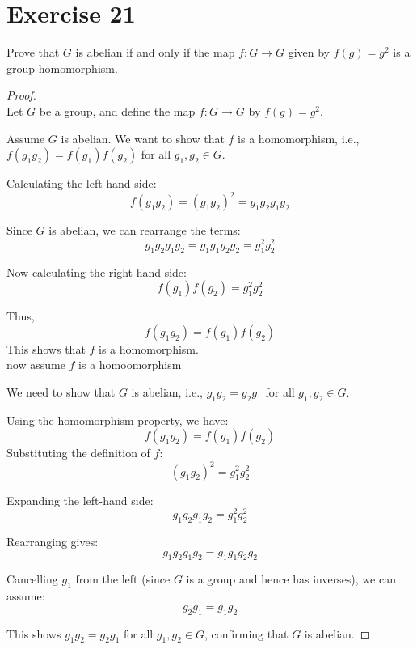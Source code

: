 \documentclass{article}
\begin{document}
\section*{Exercise 21}
Prove that $G$ is abelian if and only if the map $f: G \to G$ given by $f(g) = g^2$ is a group homomorphism.
\begin{proof}
        \leavevmode \\  
        Let \( G \) be a group, and define the map \( f: G \to G \) by \( f(g) = g^2 \).

      
        Assume $G$ is abelian. 
        We want to show that \( f \) is a homomorphism, i.e., \( f(g_1 g_2) = f(g_1) f(g_2) \) for all \( g_1, g_2 \in G \).
        
        Calculating the left-hand side:
        \[
        f(g_1 g_2) = (g_1 g_2)^2 = g_1 g_2 g_1 g_2
        \]
        
        Since \( G \) is abelian, we can rearrange the terms:
        \[
        g_1 g_2 g_1 g_2 = g_1 g_1 g_2 g_2 = g_1^2 g_2^2
        \]
        
        Now calculating the right-hand side:
        \[
        f(g_1) f(g_2) = g_1^2 g_2^2
        \]
        
        Thus,
        \[
        f(g_1 g_2) = f(g_1) f(g_2)
        \]
        This shows that \( f \) is a homomorphism. \\ now assume $f$ is a homoomorphism
        
        We need to show that \( G \) is abelian, i.e., \( g_1 g_2 = g_2 g_1 \) for all \( g_1, g_2 \in G \).
        
        Using the homomorphism property, we have:
        \[
        f(g_1 g_2) = f(g_1) f(g_2)
        \]
        Substituting the definition of \( f \):
        \[
        (g_1 g_2)^2 = g_1^2 g_2^2
        \]
        
        Expanding the left-hand side:
        \[
        g_1 g_2 g_1 g_2 = g_1^2 g_2^2
        \]
        
        Rearranging gives:
        \[
        g_1 g_2 g_1 g_2 = g_1 g_1 g_2 g_2
        \]
        
        Cancelling \( g_1 \) from the left (since \( G \) is a group and hence has inverses), we can assume:
        \[
        g_2 g_1 = g_1 g_2
        \]
        
        This shows \( g_1 g_2 = g_2 g_1 \) for all \( g_1, g_2 \in G \), confirming that \( G \) is abelian.
    \end{proof}
\end{document}
